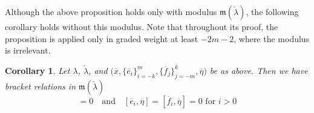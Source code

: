 \documentclass[11pt,letterpaper]{amsart}
\newtheorem{corollary}[theorem]{Corollary}
\numberwithin{equation}{section}
\newcommand{\oline}{\overline}
\begin{document}
Although the above proposition holds only with modulus $\mathfrak{m}(\check\lambda)$, the following corollary holds without this modulus. Note that throughout its proof, the proposition is applied only in graded weight at least $-2m-2$, where the modulus is irrelevant.

\begin{corollary}
    \label{cor: more m rels}
    Let $\lambda$, $\check\lambda$, and $\big(\oline x,\{\oline e_i\}_{i=-k}^{m},\{\oline f_j\}_{j=-m}^k,\oline \eta\big)$ be as above. Then we have bracket relations in ${\mathfrak{m}}(\check\lambda)$ 
    \begin{equation}
        [\oline x,\oline \eta] = 0\quad \text{and}\quad [\oline e_i,\oline \eta] = [\oline f_i, \oline \eta] = 0\text{ for }i>0
    \end{equation}
\end{corollary}
\end{document}
